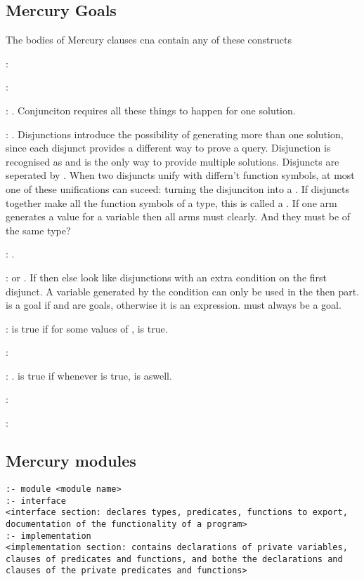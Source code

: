 \subsection{Mercury Goals}
The bodies of Mercury clauses cna contain any of these constructs 
\begin{compactitem}
\item {}: 
\item {}: 
\item {}: . Conjunciton requires all these things to happen for one solution.
\item {}: . Disjunctions introduce the possibility of generating
more than one solution, since each disjunct provides
a different way to prove a query. Disjunction is recognised as  and is the only way to provide multiple solutions. Disjuncts are seperated by . When two disjuncts unify with differn't function symbols, at most one of these unifications can suceed: turning the disjunciton into a . If disjuncts together make all the function symbols of a type, this is called a . If one arm generates a value for a variable then all arms must clearly. And they must be of the same type?
\item {}: . 
\item {}:  or
. If then else look like disjunctions with an extra condition on the first disjunct. A variable generated by the condition can only be used in the then part.  is a goal if  and  are goals, otherwise it is an expression.  must always be a goal. 
\item {}:
 is true if for some values of \e{[V1,...,Vn]},  is true.
\item {}:
\item {}: .  is true if whenever  is true,  is aswell.
\item {}:
\item {}:
\end{compactitem}

\subsection{Mercury modules}
\item \begin{lstlisting}
:- module <module name>
:- interface
<interface section: declares types, predicates, functions to export, documentation of the functionality of a program>
:- implementation
<implementation section: contains declarations of private variables, clauses of predicates and functions, and bothe the declarations and clauses of the private predicates and functions>
\end{lstlisting}

